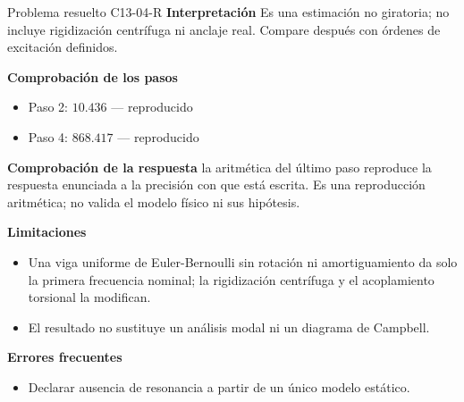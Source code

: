 \documentclass[10pt,openany]{book}
\begin{document}
\begin{studiumworked}{Problema resuelto C13-04-R}
\noindent\textbf{Interpretación}
Es una estimación no giratoria; no incluye rigidización centrífuga ni anclaje real. Compare después con órdenes de excitación definidos.

\noindent\textbf{Comprobación de los pasos}
\begin{itemize}
\item Paso 2: $10.436$ — reproducido
\item Paso 4: $868.417$ — reproducido
\end{itemize}

\noindent\textbf{Comprobación de la respuesta} la aritmética del último paso reproduce la respuesta enunciada a la precisión con que está escrita. Es una reproducción aritmética; no valida el modelo físico ni sus hipótesis.

\noindent\textbf{Limitaciones}
\begin{itemize}
\item Una viga uniforme de Euler-Bernoulli sin rotación ni amortiguamiento da solo la primera frecuencia nominal; la rigidización centrífuga y el acoplamiento torsional la modifican.
\item El resultado no sustituye un análisis modal ni un diagrama de Campbell.
\end{itemize}

\noindent\textbf{Errores frecuentes}
\begin{itemize}
\item Declarar ausencia de resonancia a partir de un único modelo estático.
\end{itemize}
\end{studiumworked}
\end{document}
